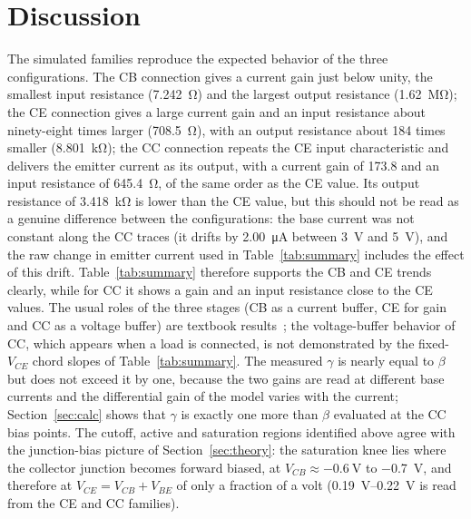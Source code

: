 \documentclass[12pt,a4paper]{article}
\begin{document}
	\section{Discussion}
	The simulated families reproduce the expected behavior of the three
	configurations. The CB connection gives a current gain just below unity,
	the smallest input resistance (\SI{7.242}{\ohm}) and the largest output
	resistance (\SI{1.62}{\mega\ohm}); the CE connection gives a large
	current gain and an input resistance about ninety-eight times larger
	(\SI{708.5}{\ohm}), with an output resistance about 184 times
	smaller (\SI{8.801}{\kilo\ohm}); the CC connection repeats the CE input
	characteristic and delivers the emitter current as its output, with a
	current gain of \num{173.8} and an input resistance of
	\SI{645.4}{\ohm}, of the same order as the CE value. Its output
	resistance of \SI{3.418}{\kilo\ohm} is lower than the CE value, but this
	should not be read as a genuine difference between the configurations: the
	base current was not constant along the CC traces (it drifts by
	\SI{2.00}{\micro\ampere} between \SI{3}{\volt} and \SI{5}{\volt}), and
	the raw change in emitter current used in Table~\ref{tab:summary}
	includes the effect of this drift. Table~\ref{tab:summary} therefore
	supports the CB and CE trends clearly, while for CC it shows a gain and
	an input resistance close to the CE values. The usual roles of the three
	stages (CB as a current buffer, CE for gain and CC as a voltage buffer)
	are textbook results~\cite{ref:sedra,ref:theraja}; the voltage-buffer
	behavior of CC, which appears when a load is connected, is not
	demonstrated by the fixed-$V_{CE}$ chord slopes of Table~\ref{tab:summary}.
	The measured $\gamma$ is nearly equal to $\beta$ but does not exceed it
	by one, because the two gains are read at different base currents and the
	differential gain of the model varies with the current; Section~\ref{sec:calc}
	shows that $\gamma$ is exactly one more than $\beta$ evaluated at the CC
	bias points. The cutoff,
	active and saturation regions identified above agree with the
	junction-bias picture of Section~\ref{sec:theory}: the saturation knee
	lies where the collector junction becomes forward biased, at
	$V_{CB} \approx \SI{-0.6}{\volt}$ to \SI{-0.7}{\volt}, and therefore at
	$V_{CE} = V_{CB} + V_{BE}$ of only a fraction of a volt (\SIrange{0.19}{0.22}{\volt}
	is read from the CE and CC families).
\end{document}
